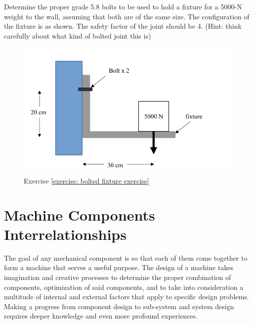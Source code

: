 \documentclass[
10pt,
a4paper,
openany,
svgnames,
]{book}
\newcommand{\exercise}{%
\item \label{lab:\arabic{chapter}-\arabic{exercisesi}}  %
}
\begin{document}
\begin{exercises}
  \exercise \label{exercise: bolted fixture exercise} Determine the proper grade 5.8 bolts to be used to hold a fixture for a 5000-N weight to the wall, assuming that both are of the same size. The configuration of the fixture is as shown. The safety factor of the joint should be 4. (Hint: think carefully about what kind of bolted joint this is)

  \begin{figure}[H]
    \centering
    \includegraphics[scale=0.8]{pictures/Bolt/bolted-fixture-exercise}
    \caption{Exercise \ref{exercise: bolted fixture exercise}}
  \end{figure}

\end{exercises}


\chapter{Machine Components Interrelationships}

The goal of any mechanical component is so that each of them come together to form a machine that serves a useful purpose. The design of a machine takes imagination and creative processes to determine the proper combination of components, optimization of said components, and to take into consideration a multitude of internal and external factors that apply to specific design problems. Making a progress from component design to sub-system and system design requires deeper knowledge and even more profound experiences.
\end{document}

